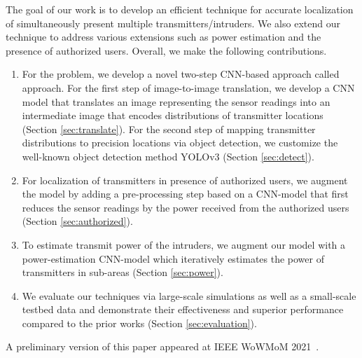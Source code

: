   The goal of our work is to develop an
efficient technique for accurate localization of simultaneously
present multiple transmitters/intruders. We also extend our technique to address various
extensions such as power estimation and the presence of authorized users. Overall, we make the following 
contributions.
\begin{enumerate}
\item
For the \mtl problem, we develop a novel two-step CNN-based approach called \our approach. 
For the first step of image-to-image translation, we develop a CNN model that translates an image representing the sensor readings into an intermediate image that encodes distributions of transmitter locations (Section \ref{sec:translate}). 
For the second step of mapping transmitter distributions to precision locations via object detection,
we customize the well-known  object detection method YOLOv3 (Section \ref{sec:detect}).

\item
For localization of transmitters in presence of authorized users, we 
augment the \our model by adding a pre-processing step based on a 
CNN-model that first reduces the 
sensor readings by the power received from the authorized users (Section \ref{sec:authorized}).

\item
To estimate transmit power of the intruders, we augment our \our model
with a power-estimation CNN-model which iteratively estimates the power of transmitters
in sub-areas (Section \ref{sec:power}).

\item
We evaluate our techniques via large-scale simulations as well as a small-scale testbed data and demonstrate their effectiveness and superior
performance compared to the prior works (Section \ref{sec:evaluation}).
\end{enumerate}

A preliminary version of this paper appeared at IEEE WoWMoM 2021~\cite{wowmom21-deepmtl}.





